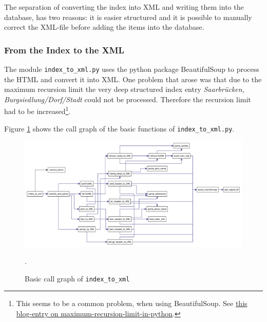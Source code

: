 The separation of converting the index into XML and writing them into the database, has two reasons: it is easier structured and it is possible to manually correct the XML-file before adding the items into the database.

\subsubsection{From the Index to the XML}
The module \texttt{index\_to\_xml.py} uses the python package BeautifulSoup to process the HTML and convert it into XML. One problem that arose was that due to the maximum recursion limit the very deep structured index entry \textit{Saarbrücken, Burgsiedlung/Dorf/Stadt} could not be processed. Therefore the recursion limit had to be increased\footnote{This seems to be a common problem, when using BeautifulSoup. See \href{http://blog.pablohoffman.com/maximum-recursion-limit-in-python}{this blog-entry on maximum-recursion-limit-in-python}.}.

Figure \ref{fig:index-to-xml} shows the call graph of the basic functions of \texttt{index\_to\_xml.py}.

\begin{figure}[h]
  \centering
  \includegraphics[scale=0.3]{img/index-to-xml}
  \caption{Basic call graph of \texttt{index\_to\_xml}}.
  \label{fig:index-to-xml}
\end{figure}

